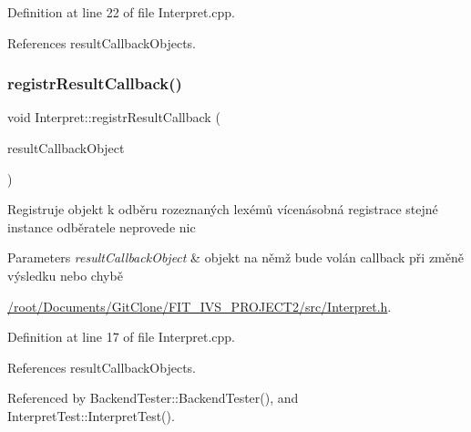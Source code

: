 Definition at line 22 of file Interpret.\+cpp.



References result\+Callback\+Objects.

\mbox{\label{classteam22_1_1_calc_1_1_interpret_a23e1e307b4f7ffd42f8eb31d33314c41}} 
\subsubsection{\texorpdfstring{registr\+Result\+Callback()}{registrResultCallback()}}
{\footnotesize\ttfamily void Interpret\+::registr\+Result\+Callback (\begin{DoxyParamCaption}\item[{\hyperlink{classteam22_1_1_calc_1_1_result_observer}{Result\+Observer} $\ast$}]{result\+Callback\+Object }\end{DoxyParamCaption})}

Registruje objekt k odběru rozeznaných lexémů vícenásobná registrace stejné instance odběratele neprovede nic


\begin{DoxyParams}{Parameters}
{\em result\+Callback\+Object} & objekt na němž bude volán callback při změně výsledku nebo chybě \\
\hline
\end{DoxyParams}
\begin{Desc}
\item[Examples\+: ]\par
\hyperlink{_2root_2_documents_2_git_clone_2_f_i_t__i_v_s__p_r_o_j_e_c_t2_2src_2_interpret_8h-example}{/root/\+Documents/\+Git\+Clone/\+F\+I\+T\+\_\+\+I\+V\+S\+\_\+\+P\+R\+O\+J\+E\+C\+T2/src/\+Interpret.\+h}.\end{Desc}


Definition at line 17 of file Interpret.\+cpp.



References result\+Callback\+Objects.



Referenced by Backend\+Tester\+::\+Backend\+Tester(), and Interpret\+Test\+::\+Interpret\+Test().

\mbox{\label{classteam22_1_1_calc_1_1_interpret_a479c65c010f4ef1060049b684e5f7eb6}} 

